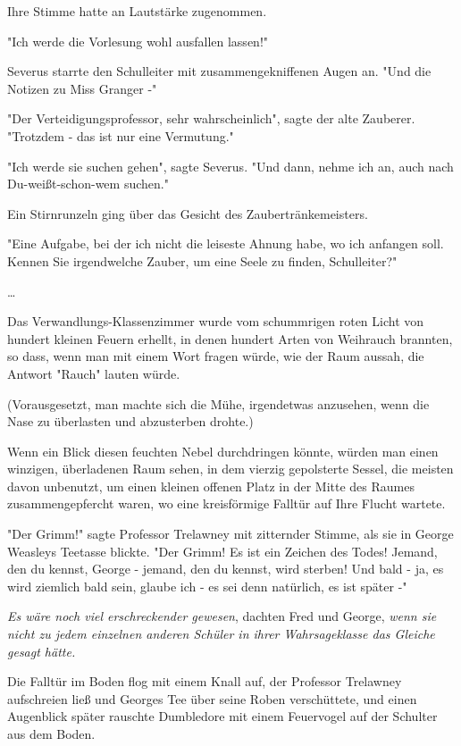 {Ihre Stimme hatte an Lautstärke zugenommen.

"Ich werde die Vorlesung wohl ausfallen lassen!"

Severus starrte den Schulleiter mit zusammengekniffenen Augen an. "Und die Notizen zu Miss Granger -"

"Der Verteidigungsprofessor, sehr wahrscheinlich", sagte der alte Zauberer. "Trotzdem - das ist nur eine Vermutung."

"Ich werde sie suchen gehen", sagte Severus. "Und dann, nehme ich an, auch nach Du-weißt-schon-wem suchen."

Ein Stirnrunzeln ging über das Gesicht des Zaubertränkemeisters.

"Eine Aufgabe, bei der ich nicht die leiseste Ahnung habe, wo ich anfangen soll. Kennen Sie irgendwelche Zauber, um eine Seele zu finden, Schulleiter?"

…

Das Verwandlungs-Klassenzimmer wurde vom schummrigen roten Licht von hundert kleinen Feuern erhellt, in denen hundert Arten von Weihrauch brannten, so dass, wenn man mit einem Wort fragen würde, wie der Raum aussah, die Antwort "Rauch" lauten würde.

(Vorausgesetzt, man machte sich die Mühe, irgendetwas anzusehen, wenn die Nase zu überlasten und abzusterben drohte.)

Wenn ein Blick diesen feuchten Nebel durchdringen könnte, würden man einen winzigen, überladenen Raum sehen, in dem vierzig gepolsterte Sessel, die meisten davon unbenutzt, um einen kleinen offenen Platz in der Mitte des Raumes zusammengepfercht waren, wo eine kreisförmige Falltür auf Ihre Flucht wartete.

"Der Grimm!" sagte Professor Trelawney mit zitternder Stimme, als sie in George Weasleys Teetasse blickte. "Der Grimm! Es ist ein Zeichen des Todes! Jemand, den du kennst, George - jemand, den du kennst, wird sterben! Und bald - ja, es wird ziemlich bald sein, glaube ich - es sei denn natürlich, es ist später -"

\emph{Es wäre noch viel erschreckender gewesen}, dachten Fred und George, \emph{wenn sie nicht zu jedem einzelnen anderen Schüler in ihrer Wahrsageklasse das Gleiche gesagt hätte.}

Die Falltür im Boden flog mit einem Knall auf, der Professor Trelawney aufschreien ließ und Georges Tee über seine Roben verschüttete, und einen Augenblick später rauschte Dumbledore mit einem Feuervogel auf der Schulter aus dem Boden.

}
